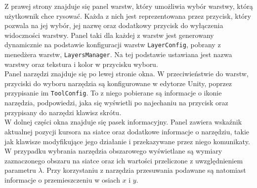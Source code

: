 Z prawej strony znajduje się panel warstw, który umożliwia wybór warstwy, którą użytkownik chce rysować.
Każda z nich jest reprezentowana przez przycisk, który pozwala na jej wybór,
jej nazwę oraz dodatkowy przycisk do wyłączenia widoczności warstwy.
Panel taki dla każdej z warstw jest generowany dynamicznie na podstawie konfiguracji warstw \texttt{LayerConfig},
pobrany z menedżera warstw, \texttt{LayersManager}.
Na tej podstawie ustawiana jest nazwa warstwy oraz tekstura i kolor w przycisku wyboru.\\
\indent Panel narzędzi znajduje się po lewej stronie okna.
W przeciwieństwie do warstw, przyciski do wyboru narzędzia są konfigurowane w edytorze Unity,
poprzez przypisanie im \texttt{ToolConfig}.
To z niego pobierane są informacje o ikonie narzędzia, podpowiedzi, jaka się wyświetli po najechaniu na przycisk
oraz przypisany do narzędzi klawisz skrótu.\\
\indent W dolnej części okna znajduje się pasek informacyjny.
Panel zawiera wskaźnik aktualnej pozycji kursora na siatce oraz dodatkowe informacje o narzędziu,
takie jak klawisze modyfikujące jego działanie i przekazywane przez niego komunikaty.
W przypadku wybrania narzędzia obszarowego wyświetlane są wymiary zaznaczonego obszaru na siatce
oraz ich wartości przeliczone z uwzględnieniem parametru $\lambda$.
Przy korzystaniu z narzędzia przesuwania podawane są natomiast informacje o przemieszczeniu w osiach $x$ i $y$.
